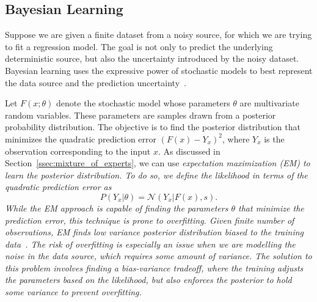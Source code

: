 \subsection{Bayesian Learning}
\label{ssec:bayesianLearning}

Suppose we are given a finite dataset from a noisy source, for which we are
trying to fit a regression model.
%
The goal is not only to predict the underlying deterministic source, but also
the uncertainty introduced by the noisy dataset.
%
Bayesian learning uses the expressive power of stochastic models to best
represent the data source and the prediction uncertainty~\cite{bishop2006pattern}.


Let $F(x; \theta)$ denote the stochastic model whose parameters $\theta$ are
multivariate random variables.
%
These parameters are samples drawn from a posterior probability distribution.
%
The objective is to find the posterior distribution that minimizes the quadratic
prediction error $(F(x) -  Y_x)^2$, where $Y_x$ is the observation
corresponding to the input $x$.
%
As discussed in Section~\ref{ssec:mixture_of_experts}, we can use
\it{expectation maximization} \normalfont (EM) to learn the posterior
distribution.
%
To do so, we define the likelihood in terms of the quadratic prediction error as
\begin{equation*}
  P(Y_x | \theta)  = \mathcal{N}(Y_x | F(x), s).
\end{equation*}
%
While the EM approach is capable of finding the parameters $\theta$ that
minimize the prediction error, this technique is prone to overfitting.
%
Given finite number of observations, EM finds low variance posterior
distribution \it{biased to the training
data}\normalfont~\cite{bishop2006pattern}. 
%
The risk of overfitting is especially an issue when we are modelling the noise
in the data source, which requires some amount of variance.
%
The solution to this problem involves finding a \it{bias-variance
tradeoff}\normalfont, where the training adjusts the parameters based on the
likelihood, but also enforces the posterior to hold some variance to prevent
overfitting.
%
